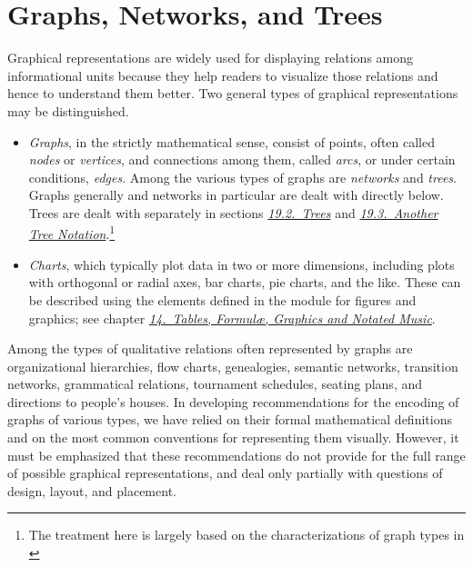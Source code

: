 
\section[{Graphs, Networks, and Trees}]{Graphs, Networks, and Trees}\label{GD}\par
Graphical representations are widely used for displaying relations among informational units because they help readers to visualize those relations and hence to understand them better. Two general types of graphical representations may be distinguished. \begin{itemize}
\item \textit{Graphs}, in the strictly mathematical sense, consist of points, often called \textit{nodes} or \textit{vertices}, and connections among them, called \textit{arcs}, or under certain conditions, \textit{edges}. Among the various types of graphs are \textit{networks} and \textit{trees}. Graphs generally and networks in particular are dealt with directly below. Trees are dealt with separately in sections \textit{\hyperref[GDTR]{19.2.\ Trees}} and \textit{\hyperref[GDAT]{19.3.\ Another Tree Notation}}.\footnote{The treatment here is largely based on the characterizations of graph types in \cite{GD-BIBL-1}}
\item \textit{Charts}, which typically plot data in two or more dimensions, including plots with orthogonal or radial axes, bar charts, pie charts, and the like. These can be described using the elements defined in the module for figures and graphics; see chapter \textit{\hyperref[FT]{14.\ Tables, Formulæ, Graphics and Notated Music}}.
\end{itemize} \par
Among the types of qualitative relations often represented by graphs are organizational hierarchies, flow charts, genealogies, semantic networks, transition networks, grammatical relations, tournament schedules, seating plans, and directions to people's houses. In developing recommendations for the encoding of graphs of various types, we have relied on their formal mathematical definitions and on the most common conventions for representing them visually. However, it must be emphasized that these recommendations do not provide for the full range of possible graphical representations, and deal only partially with questions of design, layout, and placement.
